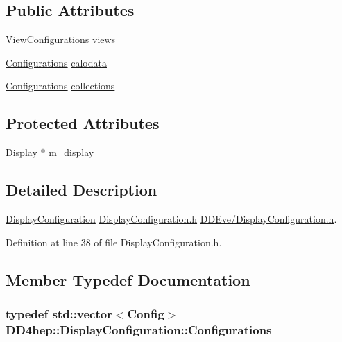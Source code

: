 \subsection*{Public Attributes}
\begin{DoxyCompactItemize}
\item 
\hyperlink{class_d_d4hep_1_1_display_configuration_a38d6c82b57ac859a5d5cf67fe26f4920}{ViewConfigurations} \hyperlink{class_d_d4hep_1_1_display_configuration_a630bc25ef7e739a5067c72b6b7996527}{views}
\item 
\hyperlink{class_d_d4hep_1_1_display_configuration_ac43586ae2c70f106cc9027d452d383d7}{Configurations} \hyperlink{class_d_d4hep_1_1_display_configuration_a8ff4fbadd2821a8dbbc0f5006f60357f}{calodata}
\item 
\hyperlink{class_d_d4hep_1_1_display_configuration_ac43586ae2c70f106cc9027d452d383d7}{Configurations} \hyperlink{class_d_d4hep_1_1_display_configuration_af92e64fe8730543b07e698279dd23f7a}{collections}
\end{DoxyCompactItemize}
\subsection*{Protected Attributes}
\begin{DoxyCompactItemize}
\item 
\hyperlink{class_d_d4hep_1_1_display}{Display} $\ast$ \hyperlink{class_d_d4hep_1_1_display_configuration_aafc55c829834377c847861133f87637a}{m\_\-display}
\end{DoxyCompactItemize}


\subsection{Detailed Description}
\hyperlink{class_d_d4hep_1_1_display_configuration}{DisplayConfiguration} \hyperlink{_display_configuration_8h}{DisplayConfiguration.h} \hyperlink{_display_configuration_8h}{DDEve/DisplayConfiguration.h}. 

Definition at line 38 of file DisplayConfiguration.h.

\subsection{Member Typedef Documentation}
\hypertarget{class_d_d4hep_1_1_display_configuration_ac43586ae2c70f106cc9027d452d383d7}{
\subsubsection[{Configurations}]{\setlength{\rightskip}{0pt plus 5cm}typedef std::vector$<${\bf Config}$>$ {\bf DD4hep::DisplayConfiguration::Configurations}}}
\label{class_d_d4hep_1_1_display_configuration_ac43586ae2c70f106cc9027d452d383d7}


